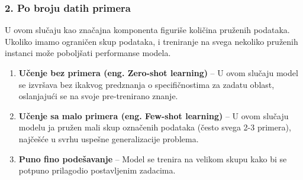 \documentclass[12pt,oneside]{memoir}
\begin{document}
\subsubsection{2. Po broju datih primera}
U ovom slučaju kao značajna komponenta figuriše količina pruženih podataka. Ukoliko imamo ograničen skup podataka, i treniranje na svega nekoliko pruženih instanci može poboljšati performanse modela.
\begin{enumerate}
	\item \textbf{Učenje bez primera (eng. Zero-shot learning)} – U ovom slučaju model se izvršava bez ikakvog predznanja o specifičnostima za zadatu oblast, oslanjajući se na svoje pre-trenirano znanje.
	\item \textbf{Učenje sa malo primera (eng. Few-shot learning)} – U ovom slučaju modelu ja pružen mali skup označenih podataka (često svega 2-3 primera), najčešće u svrhu uspešne generalizacije problema.
	\item \textbf{Puno fino podešavanje} – Model se trenira na velikom skupu kako bi se potpuno prilagodio postavljenim zadacima.
\end{enumerate}
\end{document}
